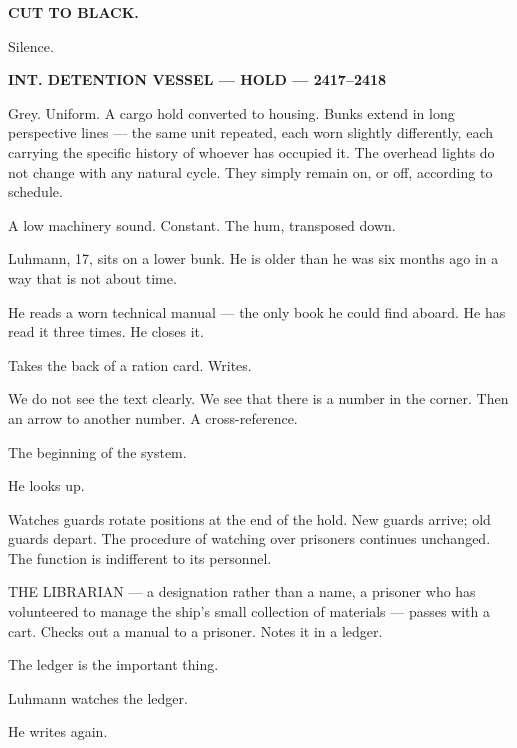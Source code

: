 \documentclass[12pt]{article}
\newcommand{\sceneheading}[1]{%
  \vspace{10pt}%
  \noindent\textbf{#1}%
  \vspace{6pt}%
}
\newcommand{\trans}[1]{%
  \vspace{8pt}%
  \begin{flushright}\textbf{#1}\end{flushright}%
  \vspace{4pt}%
}
\newenvironment{action}{%
  \vspace{4pt}%
  \noindent\ignorespaces%
}{%
  \vspace{6pt}%
}
\begin{document}
\trans{CUT TO BLACK.}

\begin{action}
Silence.
\end{action}

\sceneheading{INT. DETENTION VESSEL — HOLD — 2417–2418}

\begin{action}
Grey. Uniform. A cargo hold converted to housing. Bunks extend in long perspective lines — the same unit repeated, each worn slightly differently, each carrying the specific history of whoever has occupied it. The overhead lights do not change with any natural cycle. They simply remain on, or off, according to schedule.

\medskip

A low machinery sound. Constant. The hum, transposed down.

\medskip

Luhmann, 17, sits on a lower bunk. He is older than he was six months ago in a way that is not about time.

\medskip

He reads a worn technical manual — the only book he could find aboard. He has read it three times. He closes it.

\medskip

Takes the back of a ration card. Writes.

\medskip

We do not see the text clearly. We see that there is a number in the corner. Then an arrow to another number. A cross-reference.

The beginning of the system.

\medskip

He looks up.

\medskip

Watches guards rotate positions at the end of the hold. New guards arrive; old guards depart. The procedure of watching over prisoners continues unchanged. The function is indifferent to its personnel.

\medskip

THE LIBRARIAN — a designation rather than a name, a prisoner who has volunteered to manage the ship's small collection of materials — passes with a cart. Checks out a manual to a prisoner. Notes it in a ledger.

\medskip

The ledger is the important thing.

\medskip

Luhmann watches the ledger.

He writes again.
\end{action}
\end{document}
